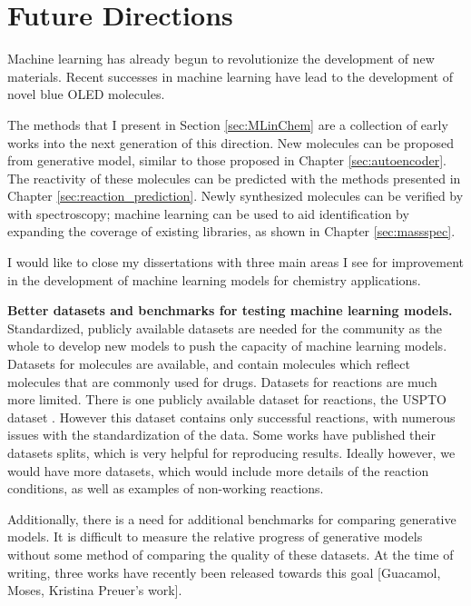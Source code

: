 \chapter{Future Directions}\label{ch:future_directions}
\dsp

Machine learning has already begun to revolutionize the development of new materials.
Recent successes in machine learning have lead to the development of novel blue OLED molecules\cite{bombarelli2016}.

The methods that I present in Section \ref{sec:MLinChem} are a collection of early works into the next generation of this direction.
New molecules can be proposed from generative model, similar to those proposed in Chapter \ref{sec:autoencoder}.
The reactivity of these molecules can be predicted with the methods presented in Chapter \ref{sec:reaction_prediction}.
Newly synthesized molecules can be verified by with spectroscopy;
 machine learning can be used to aid identification by expanding the coverage of existing libraries, as shown
 in Chapter \ref{sec:massspec}.


I would like to close my dissertations with three main areas I see for improvement in the development of machine learning models for chemistry applications.

\textbf{Better datasets and benchmarks for testing machine learning models.}
Standardized, publicly available datasets are needed for the community as the whole to develop new models to push the capacity of machine learning models.
Datasets for molecules are available, and contain molecules which reflect molecules that are commonly used for drugs.
Datasets for reactions are much more limited. There is one publicly available dataset for reactions, the USPTO dataset \cite{}.
However this dataset contains only successful reactions, with numerous issues with the standardization of the data.
Some works have published their datasets splits, which is very helpful for reproducing results.
Ideally however, we would have more datasets, which would include more details of the reaction conditions, as well as examples of non-working reactions.

Additionally, there is a need for additional benchmarks for comparing generative models.
It is difficult to measure the relative progress of generative models without some method of comparing the quality of these datasets.
At the time of writing, three works have recently been released towards this goal \cite{} [Guacamol, Moses, Kristina Preuer's work].


